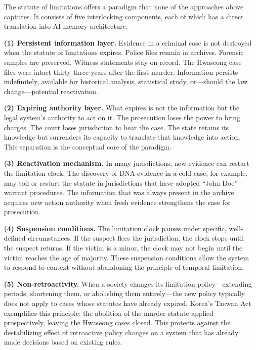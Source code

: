 \documentclass[12pt]{article}
\begin{document}
The statute of limitations offers a paradigm that none of the approaches above captures. It consists of five interlocking components, each of which has a direct translation into AI memory architecture.

\textbf{(1) Persistent information layer.} Evidence in a criminal case is not destroyed when the statute of limitations expires. Police files remain in archives. Forensic samples are preserved. Witness statements stay on record. The Hwaseong case files were intact thirty-three years after the first murder. Information persists indefinitely, available for historical analysis, statistical study, or---should the law change---potential reactivation.

\textbf{(2) Expiring authority layer.} What expires is not the information but the legal system's authority to act on it. The prosecution loses the power to bring charges. The court loses jurisdiction to hear the case. The state retains its knowledge but surrenders its capacity to translate that knowledge into action. This separation is the conceptual core of the paradigm.

\textbf{(3) Reactivation mechanism.} In many jurisdictions, new evidence can restart the limitation clock. The discovery of DNA evidence in a cold case, for example, may toll or restart the statute in jurisdictions that have adopted ``John Doe'' warrant procedures. The information that was always present in the archive acquires new action authority when fresh evidence strengthens the case for prosecution.

\textbf{(4) Suspension conditions.} The limitation clock pauses under specific, well-defined circumstances. If the suspect flees the jurisdiction, the clock stops until the suspect returns. If the victim is a minor, the clock may not begin until the victim reaches the age of majority. These suspension conditions allow the system to respond to context without abandoning the principle of temporal limitation.

\textbf{(5) Non-retroactivity.} When a society changes its limitation policy---extending periods, shortening them, or abolishing them entirely---the new policy typically does not apply to cases whose statutes have already expired. Korea's Taewan Act exemplifies this principle: the abolition of the murder statute applied prospectively, leaving the Hwaseong cases closed. This protects against the destabilizing effect of retroactive policy changes on a system that has already made decisions based on existing rules.
\end{document}
